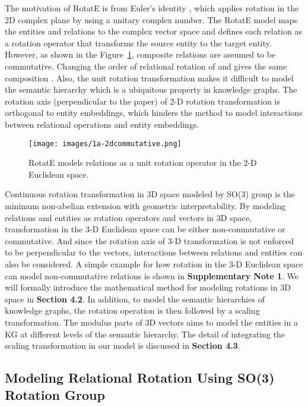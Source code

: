 \documentclass[11pt]{article}
\begin{document}
The motivation of RotatE is from Euler’s identity , which applies rotation in the 2D complex plane by using a unitary complex number. The RotatE model maps the entities and relations to the complex vector space and defines each relation as a rotation operator that transforms the source entity to the target entity. However, as shown in the Figure~\ref{rotation_in_2D}, composite relations are assumed to be commutative. Changing the order of relational rotation of  and  gives the same composition . Also, the unit rotation transformation makes it difficult to model the semantic hierarchy which is a ubiquitous property in knowledge graphs. The rotation axis (perpendicular to the paper) of 2-D rotation transformation is orthogonal to entity embeddings, which hinders the method to model interactions between relational operations and entity embeddings. 

\begin{figure}[!ht]
\centering     \centering
\texttt{[image: images/1a-2dcommutative.png]}
\caption{RotatE models relations as a unit rotation operator in the 2-D Euclidean space.}
\label{rotation_in_2D}
\end{figure}

Continuous rotation transformation in 3D space modeled by SO(3) group is the minimum non-abelian extension with geometric interpretability. By modeling relations and entities as rotation operators and vectors in 3D space, transformation in the 3-D Euclidean space can be either non-commutative or commutative. And since the rotation axis of 3-D transformation is not enforced to be perpendicular to the vectors, interactions between relations and entities can also be considered. A simple example for how rotation in the 3-D Euclidean space can model non-commutative relations is shown in \textbf{Supplementary Note 1}. We will formally introduce the mathematical method for modeling rotations in 3D space in \textbf{Section 4.2}. In addition, to model the semantic hierarchies of knowledge graphs, the rotation operation is then followed by a scaling transformation. The modulus parts of 3D vectors aims to model the entities in a KG at different levels of the semantic hierarchy. The detail of integrating the scaling transformation in our model is discussed in \textbf{Section 4.3}.



\subsection{Modeling Relational Rotation Using SO(3) Rotation Group}
\end{document}
